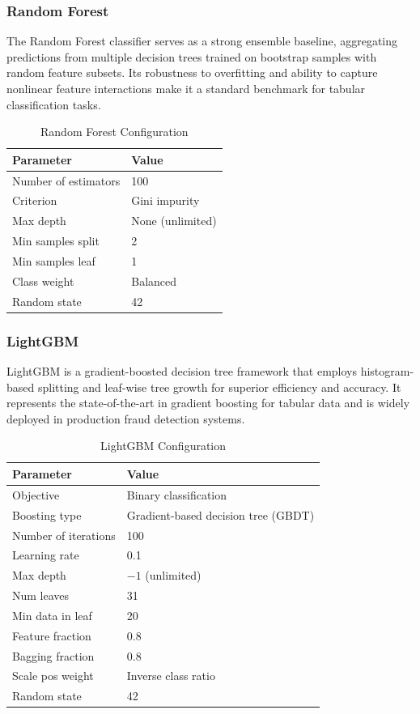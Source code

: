 \subsubsection{Random Forest}

The Random Forest classifier serves as a strong ensemble baseline, aggregating predictions from multiple decision trees trained on bootstrap samples with random feature subsets. Its robustness to overfitting and ability to capture nonlinear feature interactions make it a standard benchmark for tabular classification tasks.

\begin{table}[H]
\centering
\caption{Random Forest Configuration}
\label{tab:snn-rf-config}
\small
\begin{tabularx}{0.85\textwidth}{lX}
\toprule
\textbf{Parameter} & \textbf{Value} \\
\midrule
Number of estimators & 100 \\
Criterion & Gini impurity \\
Max depth & None (unlimited) \\
Min samples split & 2 \\
Min samples leaf & 1 \\
Class weight & Balanced \\
Random state & 42 \\
\bottomrule
\end{tabularx}
\end{table}

\subsubsection{LightGBM}

LightGBM is a gradient-boosted decision tree framework that employs histogram-based splitting and leaf-wise tree growth for superior efficiency and accuracy. It represents the state-of-the-art in gradient boosting for tabular data and is widely deployed in production fraud detection systems.

\begin{table}[H]
\centering
\caption{LightGBM Configuration}
\label{tab:snn-lgbm-config}
\small
\begin{tabularx}{0.85\textwidth}{lX}
\toprule
\textbf{Parameter} & \textbf{Value} \\
\midrule
Objective & Binary classification \\
Boosting type & Gradient-based decision tree (GBDT) \\
Number of iterations & 100 \\
Learning rate & 0.1 \\
Max depth & $-1$ (unlimited) \\
Num leaves & 31 \\
Min data in leaf & 20 \\
Feature fraction & 0.8 \\
Bagging fraction & 0.8 \\
Scale pos weight & Inverse class ratio \\
Random state & 42 \\
\bottomrule
\end{tabularx}
\end{table}

